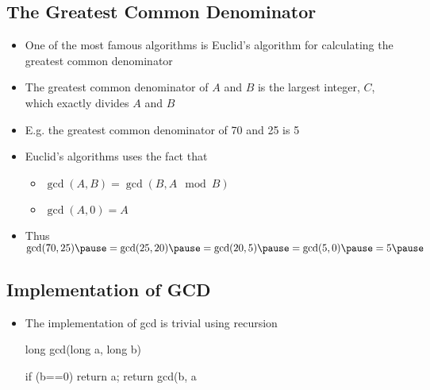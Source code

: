\begin{slide}
\section[-1]{The Greatest Common Denominator}

\begin{PauseHighLight}
  \begin{itemize}
  \item One of the most famous algorithms is Euclid's algorithm for
    calculating the greatest common denominator\pause
  \item The greatest common denominator of $A$ and $B$ is the largest
    integer, $C$, which exactly divides $A$ and $B$\pause
  \item E.g. the greatest common denominator of 70 and 25 is 5\pause
  \item Euclid's algorithms uses the fact that
    \begin{itemize}
    \item $\gcd(A, B) = \gcd(B, A \mod B)$
    \item $\gcd(A, 0) = A$\pause
    \end{itemize}
  \item Thus $\gcd(70, 25)\pause = \gcd(25, 20)\pause = \gcd(20,
  5)\pause = \gcd(5, 0)\pause =5\pause$ 
  \end{itemize}
\end{PauseHighLight}
\end{slide}


\begin{slide}
\section{Implementation of GCD}

\begin{itemize}
  \item The implementation of gcd is trivial using recursion
    \begin{java}
      long gcd(long a, long b)
      {

           if (b==0) {
              return a;
           }
           return gcd(b, a%
      }
    \end{java}
\end{itemize}

\end{slide}

